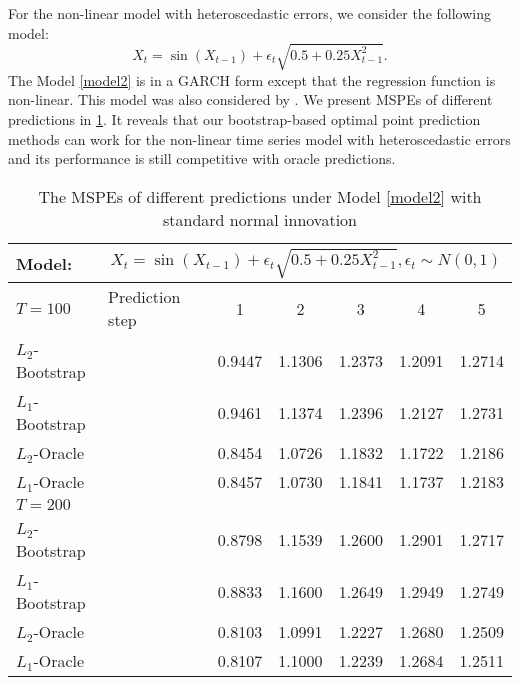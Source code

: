 \documentclass[a4paper]{article}
\begin{document}
For the non-linear model with heteroscedastic errors, we consider the following model:
\begin{equation}\label{model2}
    X_t = \sin(X_{t-1}) + \epsilon_t\sqrt{0.5 + 0.25X_{t-1}^2}.
\end{equation}
The Model \cref{model2} is in a GARCH form except that the regression function is non-linear. This model was also considered by \cite{pan2016bootstrap}. We present MSPEs of different predictions in \cref{Tablogsinxaddsqrtx_point}. It reveals that our bootstrap-based optimal point prediction methods can work for the non-linear time series model with heteroscedastic errors and its performance is still competitive with oracle predictions. 

\begin{table}[H]
\centering
  \caption{The MSPEs of different predictions under Model \cref{model2} with standard normal innovation}
  \vspace{2pt}
  \label{Tablogsinxaddsqrtx_point}
\begin{tabular}{llccccc}
  \toprule 
 Model: & \multicolumn{6}{c}{$X_t = \sin(X_{t-1}) + \epsilon_t\sqrt{0.5 + 0.25X_{t-1}^2}, \epsilon_t\sim N(0,1) $} \\
 \midrule
    $T = 100$ & Prediction step & 1     & 2     & 3     & 4     & 5 \\[3pt]
    $L_2$-Bootstrap &     & 0.9447 & 1.1306 & 1.2373 & 1.2091 & 1.2714\\
    $L_1$-Bootstrap &    &  0.9461 & 1.1374 & 1.2396 & 1.2127 & 1.2731\\
    $L_2$-Oracle &  & 0.8454 & 1.0726 & 1.1832 & 1.1722 & 1.2186 \\
    $L_1$-Oracle &   & 0.8457 & 1.0730 & 1.1841 & 1.1737 & 1.2183  \\[3pt]
    $T = 200$ &       &       &       &       &       &  \\[3pt]
    $L_2$-Bootstrap &     & 0.8798 & 1.1539 & 1.2600 & 1.2901 & 1.2717  \\
    $L_1$-Bootstrap &    & 0.8833 & 1.1600 & 1.2649 & 1.2949 & 1.2749     \\
    $L_2$-Oracle &  & 0.8103 & 1.0991 & 1.2227 & 1.2680 & 1.2509 \\
    $L_1$-Oracle &   &  0.8107 & 1.1000 & 1.2239 & 1.2684 & 1.2511 \\
       \bottomrule
    \end{tabular}\\
\end{table}
\end{document}

